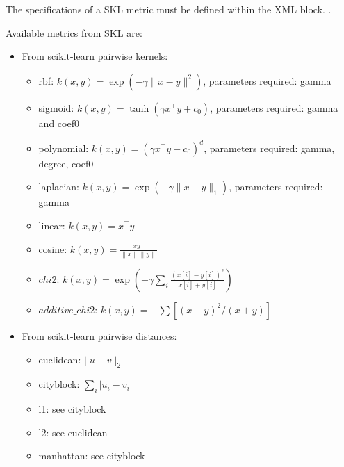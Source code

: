 The specifications of a SKL metric must be defined within the XML block.
.

Available metrics from SKL are:
\begin{itemize}
  \item   From scikit-learn pairwise kernels:
    \begin{itemize}
       \item rbf: $k(x, y) = \exp( -\gamma \| x-y \|^2)$, parameters required: gamma
       \item sigmoid: $k(x, y) = \tanh( \gamma x^\top y + c_0)$, parameters required: gamma and coef0
       \item polynomial: $k(x, y) = (\gamma x^\top y +c_0)^d$, parameters required: gamma, degree, coef0
       \item laplacian: $k(x, y) = \exp( -\gamma \| x-y \|_1)$, parameters required: gamma
       \item linear: $k(x, y) = x^\top y$
       \item cosine: $k(x, y) = \frac{x y^\top}{\|x\| \|y\|}$
       \item $chi2$: $k(x, y) = \exp \left (-\gamma \sum_i \frac{(x[i] - y[i]) ^ 2}{x[i] + y[i]} \right )$
       \item $additive\_chi2$: $k(x, y) = -\sum [(x - y)^2 / (x + y)]$
    \end{itemize}

  \item   From scikit-learn pairwise distances:
    \begin{itemize}
      \item euclidean: ${||u-v||}_2$
      \item cityblock: $\sum_i {\left| u_i - v_i \right|}$
      \item l1: see cityblock
      \item l2: see euclidean
      \item manhattan: see cityblock


\end{itemize}
\end{itemize}
